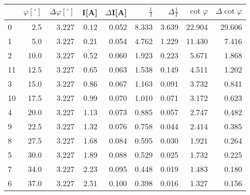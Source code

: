 \begin{tabular}{lrrrrrrrr}
\toprule
{} &  $\varphi[^\circ]$ &  $\Delta \varphi[^\circ]$ &  I[A] &  $\Delta$I[A] &  $\frac{1}{I}$ &  $\Delta \frac{1}{I}$ &  $\cot{\varphi}$ &  $\Delta \cot{\varphi}$ \\
\midrule
0  &                2.5 &                     3.227 &  0.12 &         0.052 &          8.333 &                 3.639 &           22.904 &                  29.606 \\
1  &                5.0 &                     3.227 &  0.21 &         0.054 &          4.762 &                 1.229 &           11.430 &                   7.416 \\
2  &               10.0 &                     3.227 &  0.52 &         0.060 &          1.923 &                 0.223 &            5.671 &                   1.868 \\
11 &               12.5 &                     3.227 &  0.65 &         0.063 &          1.538 &                 0.149 &            4.511 &                   1.202 \\
3  &               15.0 &                     3.227 &  0.86 &         0.067 &          1.163 &                 0.091 &            3.732 &                   0.841 \\
10 &               17.5 &                     3.227 &  0.99 &         0.070 &          1.010 &                 0.071 &            3.172 &                   0.623 \\
4  &               20.0 &                     3.227 &  1.13 &         0.073 &          0.885 &                 0.057 &            2.747 &                   0.482 \\
9  &               22.5 &                     3.227 &  1.32 &         0.076 &          0.758 &                 0.044 &            2.414 &                   0.385 \\
8  &               27.5 &                     3.227 &  1.68 &         0.084 &          0.595 &                 0.030 &            1.921 &                   0.264 \\
5  &               30.0 &                     3.227 &  1.89 &         0.088 &          0.529 &                 0.025 &            1.732 &                   0.225 \\
7  &               34.0 &                     3.227 &  2.23 &         0.095 &          0.448 &                 0.019 &            1.483 &                   0.180 \\
6  &               37.0 &                     3.227 &  2.51 &         0.100 &          0.398 &                 0.016 &            1.327 &                   0.156 \\
\bottomrule
\end{tabular}
